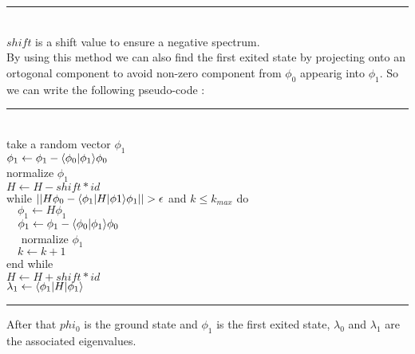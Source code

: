 \documentclass[1pt, a4paper]{article}
\begin{document}
\hrule
\noindent
\\
$shift$ is a shift value to ensure a negative spectrum.\\
By using this method we can also find the first exited state by projecting onto an ortogonal component to avoid non-zero component from $\phi_0$ appearig into $\phi_1$. So we can write the following pseudo-code :\\
\hrule
\noindent
\\
take a random vector $\phi_1$\\
$\phi_1 \leftarrow \phi_1 - \braket{\phi_0}{\phi_1}\phi_0$\\
normalize $\phi_1$\\
$H \leftarrow H - shift * id$\\
while $||H\phi_0 - \Braket{\phi_1}{H}{\phi 1}\phi_1|| > \epsilon$ and $k\leq k_{max}$ do\\
$\quad \phi_1 \leftarrow H\phi_1$\\
$\quad\phi_1 \leftarrow \phi_1 - \braket{\phi_0}{\phi_1}\phi_0$\\
$\quad$ normalize $\phi_1$\\
$\quad k \leftarrow k + 1$\\
end while\\
$H \leftarrow H + shift * id$\\
$\lambda_1 \leftarrow \Braket{\phi_1}{H}{\phi_1}$\\
\hrule
\noindent
\newpage\noindent
After that $phi_0$ is the ground state and $\phi_1$ is the first exited state, $\lambda_0$ and $\lambda_1$ are the associated eigenvalues.
\end{document}
